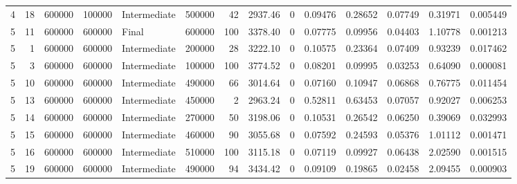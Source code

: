 \begin{table}[t]
\begin{tabular}{rrrrlrrrrrrrrr}
4 & 18 & 600000 & 100000 & Intermediate & 500000 & 42 & 2937.46 & 0 & 0.09476 & 0.28652 & 0.07749 & 0.31971 & 0.005449 \\
5 & 11 & 600000 & 600000 & Final & 600000 & 100 & 3378.40 & 0 & 0.07775 & 0.09956 & 0.04403 & 1.10778 & 0.001213 \\
5 & 1 & 600000 & 600000 & Intermediate & 200000 & 28 & 3222.10 & 0 & 0.10575 & 0.23364 & 0.07409 & 0.93239 & 0.017462 \\
5 & 3 & 600000 & 600000 & Intermediate & 100000 & 100 & 3774.52 & 0 & 0.08201 & 0.09995 & 0.03253 & 0.64090 & 0.000081 \\
5 & 10 & 600000 & 600000 & Intermediate & 490000 & 66 & 3014.64 & 0 & 0.07160 & 0.10947 & 0.06868 & 0.76775 & 0.011454 \\
5 & 13 & 600000 & 600000 & Intermediate & 450000 & 2 & 2963.24 & 0 & 0.52811 & 0.63453 & 0.07057 & 0.92027 & 0.006253 \\
5 & 14 & 600000 & 600000 & Intermediate & 270000 & 50 & 3198.06 & 0 & 0.10531 & 0.26542 & 0.06250 & 0.39069 & 0.032993 \\
5 & 15 & 600000 & 600000 & Intermediate & 460000 & 90 & 3055.68 & 0 & 0.07592 & 0.24593 & 0.05376 & 1.01112 & 0.001471 \\
5 & 16 & 600000 & 600000 & Intermediate & 510000 & 100 & 3115.18 & 0 & 0.07119 & 0.09927 & 0.06438 & 2.02590 & 0.001515 \\
5 & 19 & 600000 & 600000 & Intermediate & 490000 & 94 & 3434.42 & 0 & 0.09109 & 0.19865 & 0.02458 & 2.09455 & 0.000903 \\
\hline
\end{tabular}
\end{table}
